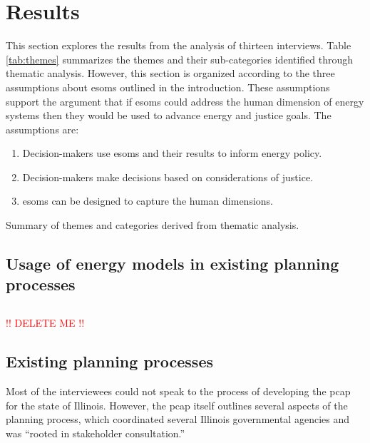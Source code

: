 \section{Results}
\label{section:interview-results}
This section explores the results from the analysis of thirteen interviews. Table
\ref{tab:themes} summarizes the themes and their sub-categories identified through
thematic analysis. However, this section is organized according to the three 
assumptions about \acp{esom} outlined in the introduction. These assumptions support
the argument that if \acp{esom} could address the human dimension of energy systems
then they would be used to advance energy and justice goals. The assumptions are:
\begin{enumerate}
    \item Decision-makers use \acp{esom} and their results to inform energy policy.
    \item Decision-makers make decisions based on considerations of justice.
    \item \acp{esom} can be designed to capture the human dimensions. 
\end{enumerate}

\begin{table}[ht!]
    \centering
    \caption{Summary of themes and categories derived from thematic analysis.}
    \label{tab:themes}
    
\end{table}
\FloatBarrier

\subsection{Usage of energy models in existing planning processes}


\subsection{}


\textcolor{red}{!! DELETE ME !!}

\subsection{Existing planning processes}
\label{section:planning-processes}
Most of the interviewees could not speak to the process of developing the
\acf{pcap} for the state of Illinois. However, the \ac{pcap} itself outlines
several aspects of the planning process, which coordinated several Illinois
governmental agencies and was ``rooted in stakeholder consultation.''


